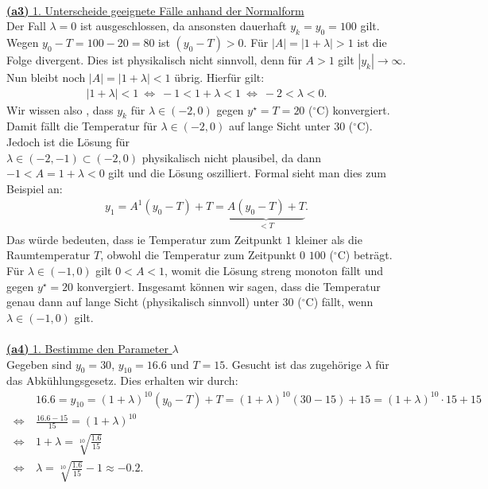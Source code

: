 \ \\
\underline{\textbf{(a3)} 1. Unterscheide geeignete Fälle anhand der Normalform}\\
Der Fall $ \lambda = 0  $ ist ausgeschlossen, da ansonsten dauerhaft $ y_k = y_0  = 100 $ gilt. 
Wegen $ y_0 - T = 100 - 20 = 80 $ ist $ (y_0 - T) > 0 $. 
Für $ | A | = |1+ \lambda | > 1 $ ist die Folge divergent. Dies ist physikalisch  nicht sinnvoll, denn für $ A > 1 $ gilt $ |y_k| \to \infty $.
Nun bleibt noch $ |A| = |1+ \lambda| < 1 $ übrig. Hierfür gilt:
\begin{align*}
	|1+ \lambda| < 1
	\ \Leftrightarrow \
	-1 < 1 + \lambda < 1
	\ \Leftrightarrow \
	-2 < \lambda < 0.
\end{align*}
Wir wissen also , dass $ y_k $ für $ \lambda \in (-2,0) $ gegen $ y^\star = T = 20 $ ($ ^\circ  $C) konvergiert. Damit fällt die Temperatur für $\lambda \in (-2,0)$ auf lange Sicht unter $ 30 $ ($ ^\circ  $C).
Jedoch ist die Lösung für \\
$ \lambda \in (-2,-1) \subset (-2,0)  $ physikalisch nicht plausibel, da dann $ -1 < A = 1+ \lambda <0 $ gilt und die Lösung oszilliert.
Formal sieht man dies zum Beispiel an:
\begin{align*}
	y_1 = A^1 (y_0 - T) + T
	= 
	\underbrace{A (y_0 - T ) + T}_{< T}.
\end{align*}
Das würde bedeuten, dass ie Temperatur zum Zeitpunkt $ 1 $ kleiner als die Raumtemperatur $ T $, obwohl die Temperatur zum Zeitpunkt $ 0 $ $ 100 $ ($ ^\circ  $C) beträgt.
Für $ \lambda \in (-1,0) $ gilt $ 0 < A < 1 $, womit die Lösung streng monoton fällt und gegen $ y^\star = 20  $ konvergiert.
Insgesamt können wir sagen, dass die Temperatur genau dann auf lange Sicht (physikalisch sinnvoll) unter $ 30 $ ($ ^\circ  $C) fällt, wenn $ \lambda \in (-1,0) $ gilt.\\
\\
\underline{\textbf{(a4)} 1. Bestimme den Parameter $ \lambda $}\\
Gegeben sind $ y_0 = 30  $, $ y_{10} = 16.6 $ und $ T = 15 $.
Gesucht ist das zugehörige $ \lambda $ für das Abkühlungsgesetz.
Dies erhalten wir durch:
\begin{align*}
	&16.6 = y_{10} = (1+ \lambda)^{10} ( y_0 - T) + T
	=
	(1+ \lambda)^{10} (30 - 15) + 15
	=
	(1+ \lambda )^{10} \cdot 15 + 15\\
	\ \Leftrightarrow \
	&\frac{16.6 - 15}{15} = (1+ \lambda )^{10}\\ 
	\ \Leftrightarrow \
	&1+ \lambda= \sqrt[10]{\frac{1.6}{15}}\\
	\ \Leftrightarrow \
	&\lambda = 
	\sqrt[10]{\frac{1.6}{15}} -1 
	\approx 
	-0.2.
\end{align*}
